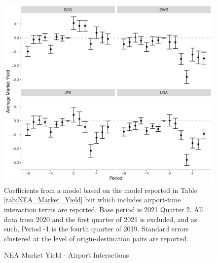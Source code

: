 \documentclass{article}
\begin{document}
\begin{appendices}
	\begin{figure}
		\caption{NEA Market Yield - Airport Interactions}
		\label{fig:NEA_Market_Yield_Interaction}
		\includegraphics[width = \linewidth]{NEA_Airport_Yield_Graph}
		\footnotesize{Coefficients from a model based on the model reported in Table \ref{tab:NEA_Market_Yield} but which includes airport-time interaction terms are reported. Base period is 2021 Quarter 2. All data from 2020 and the first quarter of 2021 is excluded, and as such, Period -1 is the fourth quarter of 2019. Standard errors clustered at the level of origin-destination pairs are reported. }
	\end{figure}	
	
\end{appendices}
	
\end{document}
